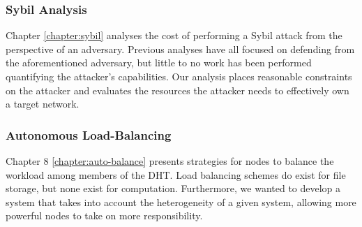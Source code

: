 \subsubsection{Sybil Analysis}
Chapter \ref{chapter:sybil} analyses the cost of performing a Sybil attack from the perspective of an adversary.
Previous analyses have all focused on defending from the aforementioned adversary, but little to no work has been performed quantifying the attacker's capabilities.
Our analysis places reasonable  constraints on the attacker and evaluates the resources the attacker needs to effectively own a target network.



\subsubsection{Autonomous Load-Balancing}
Chapter 8 \ref{chapter:auto-balance} presents strategies for nodes to balance the workload among members of the DHT.
Load balancing schemes do exist for file storage, but none exist for computation.
Furthermore, we wanted to develop a system that takes into account the heterogeneity of a given system, allowing more powerful nodes to take on more responsibility.






